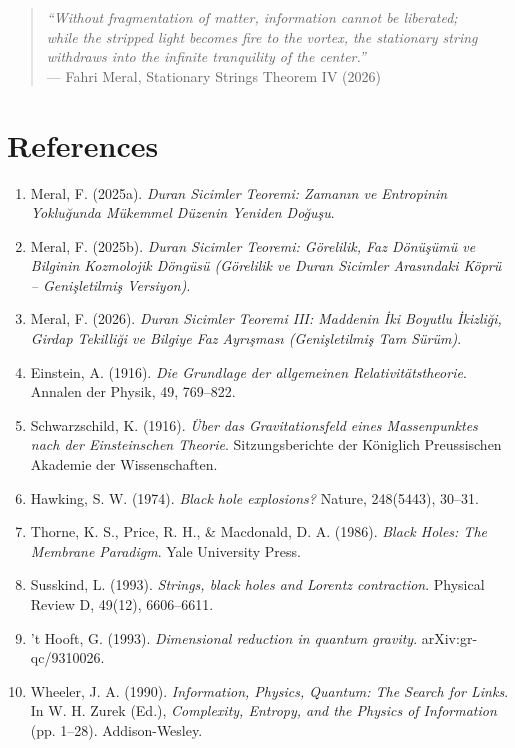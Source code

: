 \documentclass[12pt,a4paper]{article}
\begin{document}
\begin{quote}
\textit{``Without fragmentation of matter, information cannot be liberated;\\
while the stripped light becomes fire to the vortex, the stationary string withdraws into the infinite tranquility of the center.''}\\
--- Fahri Meral, Stationary Strings Theorem IV (2026)
\end{quote}

\section*{References}

\begin{enumerate}
    \item Meral, F. (2025a). \textit{Duran Sicimler Teoremi: Zamanın ve Entropinin Yokluğunda Mükemmel Düzenin Yeniden Doğuşu}.
    \item Meral, F. (2025b). \textit{Duran Sicimler Teoremi: Görelilik, Faz Dönüşümü ve Bilginin Kozmolojik Döngüsü (Görelilik ve Duran Sicimler Arasındaki Köprü – Genişletilmiş Versiyon)}.
    \item Meral, F. (2026). \textit{Duran Sicimler Teoremi III: Maddenin İki Boyutlu İkizliği, Girdap Tekilliği ve Bilgiye Faz Ayrışması (Genişletilmiş Tam Sürüm)}.
    \item Einstein, A. (1916). \textit{Die Grundlage der allgemeinen Relativitätstheorie}. Annalen der Physik, 49, 769–822.
    \item Schwarzschild, K. (1916). \textit{Über das Gravitationsfeld eines Massenpunktes nach der Einsteinschen Theorie}. Sitzungsberichte der Königlich Preussischen Akademie der Wissenschaften.
    \item Hawking, S. W. (1974). \textit{Black hole explosions?} Nature, 248(5443), 30–31.
    \item Thorne, K. S., Price, R. H., \& Macdonald, D. A. (1986). \textit{Black Holes: The Membrane Paradigm}. Yale University Press.
    \item Susskind, L. (1993). \textit{Strings, black holes and Lorentz contraction}. Physical Review D, 49(12), 6606–6611.
    \item ’t Hooft, G. (1993). \textit{Dimensional reduction in quantum gravity}. arXiv:gr-qc/9310026.
    \item Wheeler, J. A. (1990). \textit{Information, Physics, Quantum: The Search for Links}. In W. H. Zurek (Ed.), \textit{Complexity, Entropy, and the Physics of Information} (pp. 1–28). Addison-Wesley.

\end{enumerate}
\end{document}
